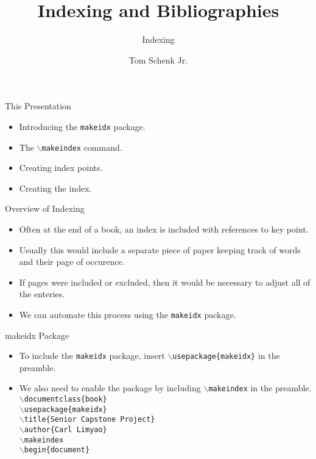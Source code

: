 \documentclass[pdf]{prosper}
\title{Indexing and Bibliographies}
\subtitle{Indexing}
\author{Tom Schenk Jr.}		%
\begin{document}
\maketitle
\begin{slide}{This Presentation}
	\begin{itemize}
		\item Introducing the \texttt{makeidx} package.
		\item The \texttt{$\backslash$makeindex} command.
		\item Creating index points.
		\item Creating the index.
	\end{itemize}
\end{slide}
\begin{slide}{Overview of Indexing}
	\begin{itemize}
		\item Often at the end of a book, an index is included with references to key point.
		\item Usually this would include a separate piece of paper keeping track of words and their page of occurence.
		\item If pages were included or excluded, then it would be necessary to adjust all of the enteries.
		\item We can automate this process using the \texttt{makeidx} package.
	\end{itemize}
\end{slide}
\begin{slide}{makeidx Package}
	\begin{itemize}
		\item To include the \texttt{makeidx} package, insert \texttt{$\backslash$usepackage\{makeidx\}} in the preamble.
		\item We also need to enable the package by including \texttt{$\backslash$makeindex} in the preamble. \\
\texttt{$\backslash$documentclass\{book\}} \\
\texttt{$\backslash$usepackage\{makeidx\}} \\
\texttt{$\backslash$title\{Senior Capstone Project\}} \\
\texttt{$\backslash$author\{Carl Limyao\}} \\
\texttt{$\backslash$makeindex} \\
\texttt{$\backslash$begin\{document\}} \\
	\end{itemize}
\end{slide}
\end{document}
